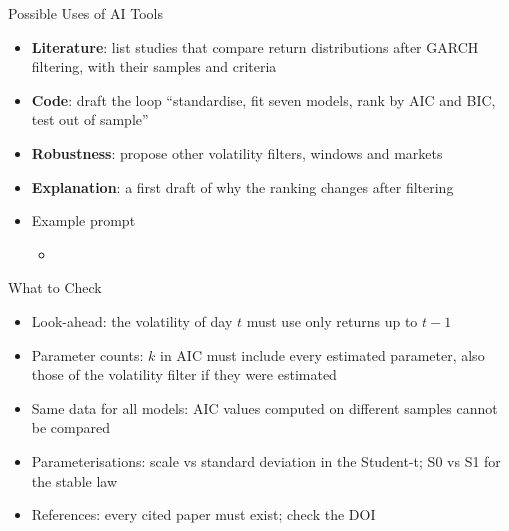 \begin{frame}{Possible Uses of AI Tools}
\itemsize{\small}
\begin{itemize}
    \item \textbf{Literature}: list studies that compare return distributions after GARCH filtering, with their samples and criteria
    \item \textbf{Code}: draft the loop ``standardise, fit seven models, rank by AIC and BIC, test out of sample''
    \item \textbf{Robustness}: propose other volatility filters, windows and markets
    \item \textbf{Explanation}: a first draft of why the ranking changes after filtering
    \item Example prompt
    \begin{itemize}
        \item {}
    \end{itemize}
\end{itemize}
\end{frame}

\begin{frame}{What to Check}
\itemsize{\small}
\begin{itemize}
    \item Look-ahead: the volatility of day $t$ must use only returns up to $t - 1$
    \item Parameter counts: $k$ in AIC must include every estimated parameter, also those of the volatility filter if they were estimated
    \item Same data for all models: AIC values computed on different samples cannot be compared
    \item Parameterisations: scale vs standard deviation in the Student-t; S0 vs S1 for the stable law
    \item References: every cited paper must exist; check the DOI
\end{itemize}
\end{frame}

